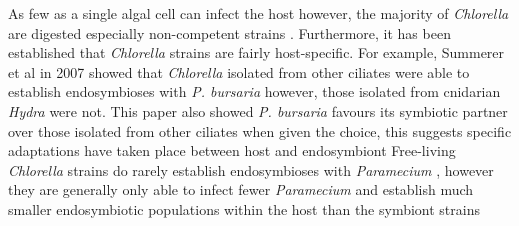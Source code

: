 As few as a single algal cell can infect the host \citep{Weiss1976} however, the majority of \textit{Chlorella} are digested especially non-competent strains \citep{Kodama2007}. 
Furthermore, it has been established that \textit{Chlorella} strains are fairly host-specific.  
For example, Summerer et al in 2007 \citep{Summerer2007} showed that \textit{Chlorella} isolated from other ciliates were able to establish endosymbioses with \textit{P. bursaria} however, those isolated from cnidarian \textit{Hydra} were not.  
This paper also showed \textit{P. bursaria} favours its symbiotic partner over those isolated from other ciliates when given the choice, this suggests specific adaptations have taken place between host and endosymbiont \citep{Summerer2007}
Free-living \textit{Chlorella} strains do rarely establish endosymbioses with \textit{Paramecium} \citep{Karakashian1959}, however they are generally only able to infect fewer \textit{Paramecium} and establish much smaller endosymbiotic populations within the host than the symbiont strains \citep{Karakashian1959}

